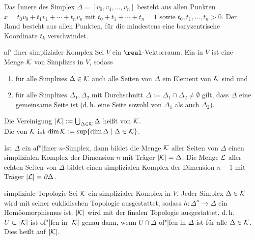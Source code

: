 \begin{Bem}
    Das Innere des Simplex $\Delta = [v_0, v_1, \dotsc, v_n]$ besteht aus
    allen Punkten \\
    $x = t_0 v_0 + t_1 v_1 + \dotsb + t_n v_n$ mit
    $t_0 + t_1 + \dotsb + t_n = 1$ sowie $t_0, t_1, \dotsc, t_n > 0$.
    Der Rand besteht aus allen Punkten, für die mindestens eine baryzentrische
    Koordinate $t_k$ verschwindet.
\end{Bem}

\linie

\begin{Def}{af"|finer simplizialer Komplex}
    Sei $V$ ein $\real$-Vektorraum.
    Ein  in $V$ ist eine Menge
    $\mathcal{K}$ von Simplizes in $V$, sodass
    \begin{enumerate}
        \item
        für alle Simplizes $\Delta \in \mathcal{K}$
        auch alle Seiten von $\Delta$ ein Element von $\mathcal{K}$ sind und
        
        \item
        für alle Simplizes $\Delta_1, \Delta_2$ mit Durchschnitt
        $\Delta := \Delta_1 \cap \Delta_2 \not= \emptyset$
        gilt, dass $\Delta$ eine gemeinsame Seite ist
        (d.\,h. eine Seite sowohl von $\Delta_1$ als auch $\Delta_2$).
    \end{enumerate}
    Die Vereinigung $|\mathcal{K}| := \bigcup_{\Delta \in \mathcal{K}} \Delta$ heißt
     von $\mathcal{K}$. \\
    Die  von $\mathcal{K}$ ist
    $\dim \mathcal{K} := \sup\{\dim \Delta \;|\; \Delta \in \mathcal{K}\}$.
\end{Def}

\begin{Bsp}
    Ist $\Delta$ ein af"|finer $n$-Simplex, dann bildet die Menge $\mathcal{K}$ aller
    Seiten von $\Delta$ einen simplizialen Komplex der Dimension $n$
    mit Träger $|\mathcal{K}| = \Delta$.
    Die Menge $\mathcal{L}$ aller echten Seiten von $\Delta$ bildet einen simplizialen
    Komplex der Dimension $n - 1$ mit Träger $|\mathcal{L}| = \partial \Delta$.
\end{Bsp}

\pagebreak

\begin{Def}{simpliziale Topologie}
    Sei $\mathcal{K}$ ein simplizialer Komplex in $V$.
    Jeder Simplex $\Delta \in \mathcal{K}$ wird mit seiner euklidischen Topologie
    ausgestattet, sodass $h\colon \Delta^n \rightarrow \Delta$
    ein Homöomorphismus ist.
    $|\mathcal{K}|$ wird mit der finalen Topologie ausgestattet, d.\,h.
    $U \subset |\mathcal{K}|$ ist of"|fen in $|\mathcal{K}|$ genau dann, wenn $U \cap \Delta$
    of"|fen in $\Delta$ ist für alle $\Delta \in \mathcal{K}$.
    Dies heißt  auf $|\mathcal{K}|$.
\end{Def}

